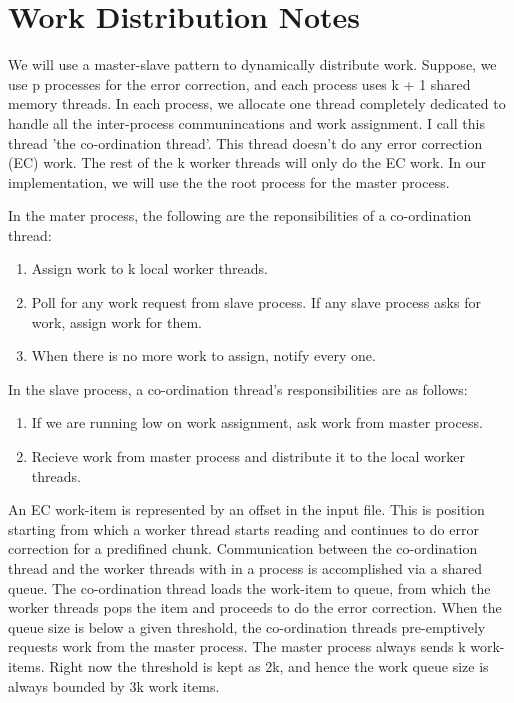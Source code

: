 \documentclass[integrals, nointegrals, article, 12pt, a4paper]{article}
\begin{document}
\section{Work Distribution Notes}
\label{sec-4}

We will use a master-slave pattern to dynamically distribute
work. Suppose, we use p processes for the error correction, and each
process uses k + 1 shared memory threads.  In each process, we allocate
one thread completely dedicated to handle all the inter-process
communincations and work assignment. I call this thread 'the
co-ordination thread'. This thread doesn't do any error correction (EC)
work. The rest of the k worker threads will only do the EC work. In our
implementation, we will use the the root process for the master process.

In the mater process, the following are the reponsibilities of a
co-ordination thread:
\begin{enumerate}
\item Assign work to k local worker threads.
\item Poll for any work request from slave process. If any slave process
asks for work, assign work for them.
\item When there is no more work to assign, notify every one.
\end{enumerate}

In the slave process, a co-ordination thread's responsibilities are as
follows:
\begin{enumerate}
\item If we are running low on work assignment, ask work from master
process.
\item Recieve work from master process and distribute it to the local
worker threads.
\end{enumerate}

An EC work-item is represented by an offset in the input file. This is
position starting from which a worker thread starts reading and
continues to do error correction for a predifined chunk. Communication
between the co-ordination thread and the worker threads with in a
process is accomplished via a shared queue. The co-ordination thread
loads the work-item to queue, from which the worker threads pops the
item and proceeds to do the error correction. When the queue size is
below a given threshold, the co-ordination threads pre-emptively
requests work from the master process. The master process always sends k
work-items. Right now the threshold is kept as 2k, and hence the work
queue size is always bounded by 3k work items.
\end{document}
